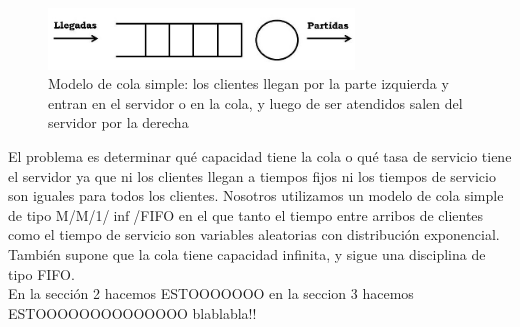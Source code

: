 \documentclass[10pt,journal,compsoc]{IEEEtran}
\begin{document}
\begin{figure}[t] %
\label{fig:colasimple}
\begin{center}
\centering
\includegraphics[width=3.2in]{cola.jpg}
\caption{Modelo de cola simple: los clientes llegan por la parte izquierda y entran en el servidor o en la cola, y luego de ser atendidos salen del servidor por la derecha}
\end{center}
\end{figure}

El problema es determinar qu\'e capacidad tiene la cola o qu\'e tasa de servicio tiene el servidor ya
que ni los clientes llegan a tiempos fijos ni los tiempos de servicio son iguales para todos los
clientes. Nosotros utilizamos un modelo de cola simple de tipo M/M/1/$\inf$/FIFO en el que tanto el
tiempo entre arribos de clientes como el tiempo de servicio son variables aleatorias con distribuci\'on
exponencial. Tambi\'en supone que la cola tiene capacidad infinita, y sigue una disciplina de tipo FIFO.\\
En la secci\'on 2 hacemos ESTOOOOOOO en la seccion 3 hacemos ESTOOOOOOOOOOOOOO blablabla!!


\end{document}
